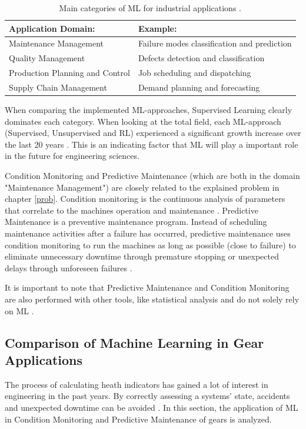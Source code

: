 \begin{table}
	\begin{center}
		\begin{tabular}{|| l | l ||}
			\hline
			\rule{0pt}{2ex}Application Domain: & Example:\\
			\hline
			\hline
			\rule{0pt}{2ex}Maintenance Management & Failure modes classification and prediction\\\hline
			Quality Management & Defects detection and classification\\	\hline
			Production Planning and Control & Job scheduling and dispatching\\\hline
			Supply Chain Management & Demand planning and forecasting\\
			\hline
		\end{tabular}
		\caption{Main categories of ML for industrial applications \cite{Bertolini}.}
		\label{MLIND}
	\end{center}
	\vspace{-4mm}
\end{table}
When comparing the implemented ML-approaches, Supervised Learning clearly dominates each category. When looking at the total field, each ML-approach (Supervised, Unsupervised and RL) experienced a significant growth increase over the last 20 years \cite{Bertolini}. This is an indicating factor that ML will play a important role in the future for engineering sciences.

Condition Monitoring and Predictive Maintenance (which are both in the domain "Maintenance Management") are closely related to the explained problem in chapter \ref{prob}.
Condition monitoring is the continuous analysis of parameters that correlate to the machines operation and maintenance \cite{Rao}. Predictive Maintenance is a preventive maintenance program. Instead of scheduling maintenance activities after a failure has occurred, predictive maintenance uses condition monitoring to run the machines as long as possible (close to failure) to eliminate unnecessary downtime through premature stopping or unexpected delays through unforeseen failures \cite{Mobley}.

It is important to note that Predictive Maintenance and Condition Monitoring are also performed with other tools, like statistical analysis and do not solely rely on ML \cite{Carvalho, Divya}. 


 
\subsection{Comparison of Machine Learning in Gear Applications}
The process of calculating heath indicators has gained a lot of interest in engineering in the past years. By correctly assessing a systems' state, accidents and unexpected downtime can be avoided \cite{Wang}. In this section, the application of ML in Condition Monitoring and Predictive Maintenance of gears is analyzed.

